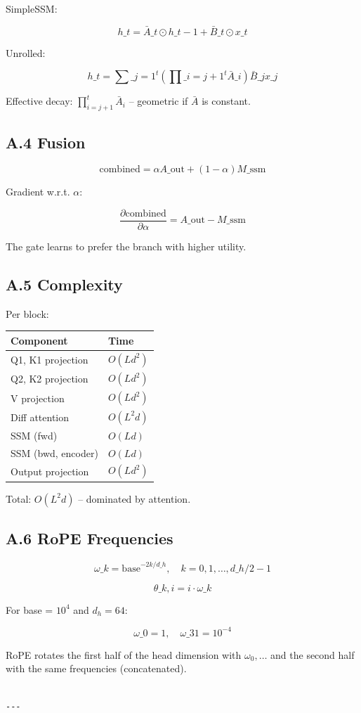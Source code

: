 SimpleSSM:

\[
h\_t = \bar{A}\_t \odot h\_{t-1} + \bar{B}\_t \odot x\_t
\tag{A.7}
\]

Unrolled:

\[
h\_t = \sum\_{j=1}^{t} \left( \prod\_{i=j+1}^{t} \bar{A}\_i \right) \bar{B}\_j x\_j
\tag{A.8}
\]

Effective decay: $\prod_{i=j+1}^t \bar{A}_i$ -- geometric if $\bar{A}$ is 
constant.

\subsection{A.4 Fusion}

\[
\text{combined} = \alpha A\_\text{out} + (1 - \alpha) M\_\text{ssm}
\tag{A.9}
\]

Gradient w.r.t. $\alpha$:

\[
\frac{\partial \text{combined}}{\partial \alpha} = A\_\text{out} - M\_\text{ssm}
\tag{A.10}
\]

The gate learns to prefer the branch with higher utility.

\subsection{A.5 Complexity}

Per block:

\begin{table}[H]
\centering
\small
\begin{tabular}{ll}
\toprule
\textbf{Component} & \textbf{Time} \\
\midrule
Q1, K1 projection & $O(L d^2)$ \\
Q2, K2 projection & $O(L d^2)$ \\
V projection & $O(L d^2)$ \\
Diff attention & $O(L^2 d)$ \\
SSM (fwd) & $O(L d)$ \\
SSM (bwd, encoder) & $O(L d)$ \\
Output projection & $O(L d^2)$ \\
\bottomrule
\end{tabular}
\end{table}

Total: $O(L^2 d)$ -- dominated by attention.

\subsection{A.6 RoPE Frequencies}

\[
\omega\_k = \text{base}^{-2k/d\_h}, \quad k = 0, 1, \dots, d\_h/2 - 1
\tag{A.11}
\]

\[
\theta\_{k, i} = i \cdot \omega\_k
\tag{A.12}
\]

For base = $10^4$ and $d_h = 64$:

\[
\omega\_0 = 1, \quad \omega\_{31} = 10^{-4}
\tag{A.13}
\]

RoPE rotates the first half of the head dimension with $\omega_0, \dots$ and 
the second half with the same frequencies (concatenated).
\begin{lstlisting}

---
\end{lstlisting}
